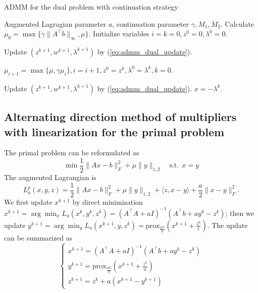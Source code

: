 \documentclass{article}
\numberwithin{equation}{section}
\numberwithin{figure}{section}
\begin{document}
\begin{algorithm}[!htbp]\caption{ADMM for the dual problem with continuation strategy}\label{alg:alm}
\begin{algorithmic}[1]
 Augmented Lagragian parameter $a$, continuation parameter $\gamma, M_1, M_2$.
Calculate $\mu_0=\max\{\gamma\|A^\top b\|_\infty,\mu\}$. Initialize variables $i=k=0,z^0=0,\lambda^0=0$.
\item Update $(z^{k+1},w^{k+1},\lambda^{k+1})$ by (\ref{eq:admm_dual_update}).
\ENDFOR
\item $\mu_{i+1}=\max\{\mu, \gamma\mu_i\}, i =i+1, z^0=z^k,\lambda^0=\lambda^k,k=0$.
\ENDWHILE
{}
\item Update $(z^{k+1},w^{k+1},\lambda^{k+1})$ by (\ref{eq:admm_dual_update}).
\ENDFOR
\STATE $x=-\lambda^k$.
\end{algorithmic}
\end{algorithm}

\subsection{Alternating direction method of multipliers with linearization for the primal problem}
The primal problem can be reformulated as
\begin{equation}
    \min \frac{1}{2}\|Ax-b\|_F^2+\mu\|y\|_{1,2}\quad \mathrm{s.t.\ \ } x=y
\end{equation}
The augmented Lagrangian is
\begin{equation}
    L_a^p(x,y,z) = \frac{1}{2}\|Ax-b\|_F^2+\mu \|y\|_{1,2}+\langle z ,x-y\rangle +\frac{a}{2}\|x-y\|_F^2.
\end{equation}
We first update $x^{k+1}$ by direct minimization $x^{k+1}=\arg\min_xL_a(x^k,y^k,z^k)=(A^\top A+aI)^{-1}(A^\top b+ay^k-z^k)$; then we update $y^{k+1}=\arg\min_yL_a(x^{k+1},y,z^k)=\mathrm{prox}_{\frac{\mu h}{a}}(x^{k+1}+\frac{z^k}{t})$. The update can be summarized as
\begin{equation}
\label{eq:admm_primal_update}
    \begin{cases}
    x^{k+1}=(A^\top A+aI)^{-1}(A^\top b+ay^k-z^k)\\
    y^{k+1}=\mathrm{prox}_{\frac{\mu h}{a}}(x^{k+1}+\frac{z^k}{a})\\
    z^{k+1}=z^k+a(x^{k+1}-y^{k+1})
    \end{cases}
\end{equation}
\end{document}
